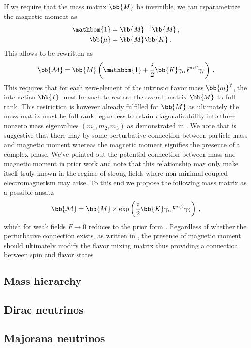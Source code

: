 If we require that the mass matrix $\bb{M}$ be invertible, we can reparametrize the magnetic moment as 
\begin{alignat}{1}
	\label{mass:eq:07a}  \mathbbm{1} &= \bb{M}^{-1}\bb{M}\,,\\
	\label{mass:eq:07b} \bb{\mu} &= \bb{M}\bb{K}\,.
\end{alignat}
This allows  to be rewritten as
\begin{alignat}{1}
	\label{mass:eq:08} {\bb{\mathcal{M}}} = \bb{M}\left(\mathbbm{1} + \frac{i}{2}\bb{K}\gamma_{\alpha}F^{\alpha\beta}\gamma_{\beta}\right)\,.
\end{alignat}
This requires that for each zero-element of the intrinsic flavor mass $\bb{m}^{f}$, the interaction $\bb{I}$ must be such to restore the overall matrix $\bb{M}$ to full rank. This restriction is however already fulfilled for $\bb{M}$ as ultimately the mass matrix must be full rank regardless to retain diagonalizability into three nonzero mass eigenvalues $(m_{1}, m_{2}, m_{3})$ as demonstrated in . We note that  is suggestive that there may by some perturbative connection between particle mass and magnetic moment whereas the magnetic moment signifies the presence of a complex phase. We've pointed out the potential connection between mass and magnetic moment in prior work and note that this relationship may only make itself truly known in the regime of strong fields where non-minimal coupled electromagnetism may arise. To this end we propose the following mass matrix as a possible ansatz
\begin{alignat}{1}
	\label{mass:eq:10} {\bb{\mathcal{M}}} = \bb{M}\times\mathrm{exp}\left(\frac{i}{2}\bb{K}\gamma_{\alpha}F^{\alpha\beta}\gamma_{\beta}\right)\,,
\end{alignat}
which for weak fields $F\rightarrow0$ reduces to the prior form . Regardless of whether the perturbative connection exists, as written in , the presence of magnetic moment should ultimately modify the flavor mixing matrix thus providing a connection between spin and flavor states
        \subsection{Mass hierarchy}
        \subsection{Dirac neutrinos}
        \subsection{Majorana neutrinos}
